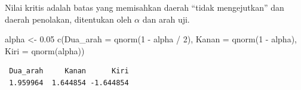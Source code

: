 \documentclass[
  indonesian,
  letterpaper,
]{book}
\newenvironment{Shaded}{\begin{snugshade}}{\end{snugshade}}
\newcommand{\AttributeTok}[1]{\textcolor[rgb]{0.40,0.45,0.13}{#1}}
\newcommand{\DecValTok}[1]{\textcolor[rgb]{0.68,0.00,0.00}{#1}}
\newcommand{\FloatTok}[1]{\textcolor[rgb]{0.68,0.00,0.00}{#1}}
\newcommand{\FunctionTok}[1]{\textcolor[rgb]{0.28,0.35,0.67}{#1}}
\newcommand{\NormalTok}[1]{\textcolor[rgb]{0.00,0.23,0.31}{#1}}
\newcommand{\OtherTok}[1]{\textcolor[rgb]{0.00,0.23,0.31}{#1}}
\newcommand{\SpecialCharTok}[1]{\textcolor[rgb]{0.37,0.37,0.37}{#1}}
\begin{document}
Nilai kritis adalah batas yang memisahkan daerah ``tidak mengejutkan''
dan daerah penolakan, ditentukan oleh \(\alpha\) dan arah uji.

\begin{Shaded}
\begin{Highlighting}[]
\NormalTok{alpha }\OtherTok{\textless{}{-}} \FloatTok{0.05}
\FunctionTok{c}\NormalTok{(}\AttributeTok{Dua\_arah =} \FunctionTok{qnorm}\NormalTok{(}\DecValTok{1} \SpecialCharTok{{-}}\NormalTok{ alpha }\SpecialCharTok{/} \DecValTok{2}\NormalTok{), }\AttributeTok{Kanan =} \FunctionTok{qnorm}\NormalTok{(}\DecValTok{1} \SpecialCharTok{{-}}\NormalTok{ alpha), }\AttributeTok{Kiri =} \FunctionTok{qnorm}\NormalTok{(alpha))}
\end{Highlighting}
\end{Shaded}

\begin{verbatim}
 Dua_arah     Kanan      Kiri 
 1.959964  1.644854 -1.644854 
\end{verbatim}
\end{document}
